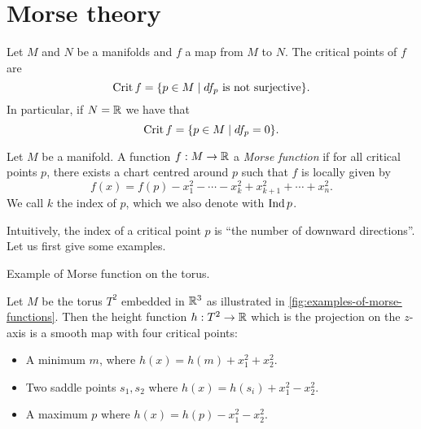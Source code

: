 \chapter{Morse theory}

\begin{definition}
    Let $M$ and $N$ be a manifolds and  $f$ a map from $M$ to $N$.
    The critical points of $f$ are
    \[
    \operatorname{Crit} f = \{p \in M  \mid \text{$df_p$ is not surjective}\} 
    .\] 
    In particular, if $N = \mathbb{R}$ we have that
    \[
    \operatorname{Crit} f = \{ p \in M  \mid  df_p = 0\} 
    .\] 
\end{definition}

\begin{definition}
    Let $M$ be a manifold. A function $f: M \to  \mathbb{R}$ a \emph{Morse function} if for all critical points $p$, there exists a chart centred around $p$ such that $f$ is locally given by
    \[
        f(x) = f(p) -x_1^2 - \cdots - x_k^2 + x_{k+1}^2 + \cdots + x_n^2
    .\] 
    We call $k$ the index of $p$, which we also denote with $\operatorname{Ind} p$.
    
\end{definition}
Intuitively, the index of a critical point $p$ is ``the number of downward directions''.
Let us first give some examples.
\begin{marginfigure}
    \centering
    \caption{Example of Morse function on the torus. }
    \label{fig:examples-of-morse-functions}
\end{marginfigure}
\begin{eg}
    Let $M$ be the torus  $T^2$ embedded in $\mathbb{R}^3$ as illustrated in \cref{fig:examples-of-morse-functions}.
    Then the height function $h: T^2 \to  \mathbb{R}$ which is the projection on the $z$-axis is a smooth map with four critical points:
    \begin{itemize}
        \item A minimum $m$, where $h(x) = h(m) + x_1^2 + x_2^2$.
        \item Two saddle points $s_1, s_2$ where $h(x) = h(s_i) + x_1^2 - x_2^2$.
        \item A maximum $p$ where $h(x) = h(p) - x_1^2 - x_2^2$.
    \end{itemize}
\end{eg}

